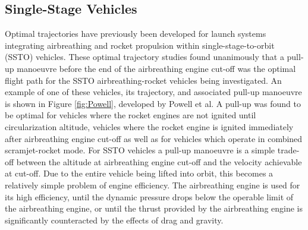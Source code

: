 \subsection{Single-Stage Vehicles}
Optimal trajectories have previously been developed for launch systems integrating airbreathing and rocket propulsion within single-stage-to-orbit (SSTO) vehicles\cite{Powell1991,Lu1993,Trefny1999,Roche2000,Pescetelli2012,Young2006,Bradford2000}. These optimal trajectory studies found unanimously that a pull-up manoeuvre before the end of the airbreathing engine cut-off was the optimal flight path for the SSTO airbreathing-rocket vehicles being investigated. An example of one of these vehicles, its trajectory, and associated pull-up manoeuvre is shown in Figure \ref{fig:Powell}, developed by Powell et al\cite{Powell1991}. A pull-up was found to be optimal for vehicles where the rocket engines are not ignited until circularization altitude\cite{Powell1991,Lu1993}, vehicles where the rocket engine is ignited immediately after airbreathing engine cut-off\cite{Trefny1999,Roche2000,Pescetelli2012} as well as for vehicles which operate in combined scramjet-rocket mode\cite{Young2006,Bradford2000}. For SSTO vehicles a pull-up manoeuvre is a simple trade-off between the altitude at airbreathing engine cut-off and the velocity achievable at cut-off. Due to the entire vehicle being lifted into orbit, this becomes a relatively simple problem of engine efficiency. The airbreathing engine is used for its high efficiency, until the dynamic pressure drops below the operable limit of the airbreathing engine, or until the thrust provided by the airbreathing engine is significantly counteracted by the effects of drag and gravity. 
